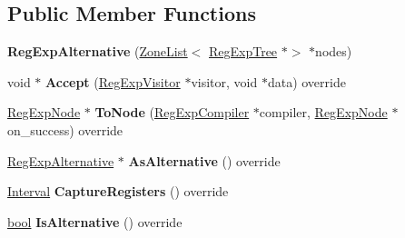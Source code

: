 \subsection*{Public Member Functions}
\begin{DoxyCompactItemize}
\item 
\mbox{\label{classv8_1_1internal_1_1RegExpAlternative_abedc10b5cab4627c760963d3914b0ae0}} 
{\bfseries Reg\+Exp\+Alternative} (\mbox{\hyperlink{classv8_1_1internal_1_1ZoneList}{Zone\+List}}$<$ \mbox{\hyperlink{classv8_1_1internal_1_1RegExpTree}{Reg\+Exp\+Tree}} $\ast$$>$ $\ast$nodes)
\item 
\mbox{\label{classv8_1_1internal_1_1RegExpAlternative_a2181f51f867cd976ad982238813a2c38}} 
void $\ast$ {\bfseries Accept} (\mbox{\hyperlink{classv8_1_1internal_1_1RegExpVisitor}{Reg\+Exp\+Visitor}} $\ast$visitor, void $\ast$data) override
\item 
\mbox{\label{classv8_1_1internal_1_1RegExpAlternative_a9ac55d877375e472eae83b627e34d42e}} 
\mbox{\hyperlink{classv8_1_1internal_1_1RegExpNode}{Reg\+Exp\+Node}} $\ast$ {\bfseries To\+Node} (\mbox{\hyperlink{classv8_1_1internal_1_1RegExpCompiler}{Reg\+Exp\+Compiler}} $\ast$compiler, \mbox{\hyperlink{classv8_1_1internal_1_1RegExpNode}{Reg\+Exp\+Node}} $\ast$on\+\_\+success) override
\item 
\mbox{\label{classv8_1_1internal_1_1RegExpAlternative_a96c326cb934776eccdac7d3f08c3c4de}} 
\mbox{\hyperlink{classv8_1_1internal_1_1RegExpAlternative}{Reg\+Exp\+Alternative}} $\ast$ {\bfseries As\+Alternative} () override
\item 
\mbox{\label{classv8_1_1internal_1_1RegExpAlternative_a73140eb9b4a63f3c2cd9cc086277a7bf}} 
\mbox{\hyperlink{classv8_1_1internal_1_1Interval}{Interval}} {\bfseries Capture\+Registers} () override
\item 
\mbox{\label{classv8_1_1internal_1_1RegExpAlternative_a05318cd9b60d5e2b92d7623aafcdd6d9}} 
\mbox{\hyperlink{classbool}{bool}} {\bfseries Is\+Alternative} () override
\item 
$$
\end{DoxyCompactItemize}
